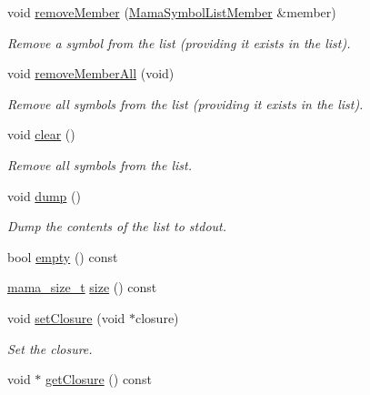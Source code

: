 \begin{DoxyCompactItemize}
void \hyperlink{classWombat_1_1MamaSymbolList_a0c10e7ec1de0fbd3b30deb023244485e}{removeMember} (\hyperlink{classWombat_1_1MamaSymbolListMember}{MamaSymbolListMember} \&member)
\begin{DoxyCompactList}\small\item\em Remove a symbol from the list (providing it exists in the list). \item\end{DoxyCompactList}\item 
void \hyperlink{classWombat_1_1MamaSymbolList_a21809320201362eb6a2786900da81dd7}{removeMemberAll} (void)
\begin{DoxyCompactList}\small\item\em Remove all symbols from the list (providing it exists in the list). \item\end{DoxyCompactList}\item 
void \hyperlink{classWombat_1_1MamaSymbolList_a63e9d516a096a15ba329744cc2d88ae7}{clear} ()
\begin{DoxyCompactList}\small\item\em Remove all symbols from the list. \item\end{DoxyCompactList}\item 
void \hyperlink{classWombat_1_1MamaSymbolList_aad43c5e64c5287414c1d02b978f3ed99}{dump} ()
\begin{DoxyCompactList}\small\item\em Dump the contents of the list to stdout. \item\end{DoxyCompactList}\item 
bool \hyperlink{classWombat_1_1MamaSymbolList_a6a23143d98e0d3c00e1b3a782fa798b4}{empty} () const 
\item 
\hyperlink{classmama__size__t}{mama\_\-size\_\-t} \hyperlink{classWombat_1_1MamaSymbolList_a71bfd4ab4ebaf41a18476509c94acd37}{size} () const 
\item 
void \hyperlink{classWombat_1_1MamaSymbolList_ac0bf254f21ab219fad953aaeb6a1b726}{setClosure} (void $\ast$closure)
\begin{DoxyCompactList}\small\item\em Set the closure. \item\end{DoxyCompactList}\item 
void $\ast$ \hyperlink{classWombat_1_1MamaSymbolList_a674ab07f378fb1fa80935f5a9b12cbb6}{getClosure} () const 

\end{DoxyCompactItemize}
